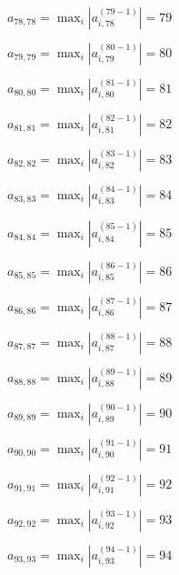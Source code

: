 \documentclass[a4paper,12pt]{article}
\begin{document}
$a _{ 78, 78 } =  \max _i |a _{ i, 78 } ^{ (79 - 1) } | = 79$

$a _{ 79, 79 } =  \max _i |a _{ i, 79 } ^{ (80 - 1) } | = 80$

$a _{ 80, 80 } =  \max _i |a _{ i, 80 } ^{ (81 - 1) } | = 81$

$a _{ 81, 81 } =  \max _i |a _{ i, 81 } ^{ (82 - 1) } | = 82$

$a _{ 82, 82 } =  \max _i |a _{ i, 82 } ^{ (83 - 1) } | = 83$

$a _{ 83, 83 } =  \max _i |a _{ i, 83 } ^{ (84 - 1) } | = 84$

$a _{ 84, 84 } =  \max _i |a _{ i, 84 } ^{ (85 - 1) } | = 85$

$a _{ 85, 85 } =  \max _i |a _{ i, 85 } ^{ (86 - 1) } | = 86$

$a _{ 86, 86 } =  \max _i |a _{ i, 86 } ^{ (87 - 1) } | = 87$

$a _{ 87, 87 } =  \max _i |a _{ i, 87 } ^{ (88 - 1) } | = 88$

$a _{ 88, 88 } =  \max _i |a _{ i, 88 } ^{ (89 - 1) } | = 89$

$a _{ 89, 89 } =  \max _i |a _{ i, 89 } ^{ (90 - 1) } | = 90$

$a _{ 90, 90 } =  \max _i |a _{ i, 90 } ^{ (91 - 1) } | = 91$

$a _{ 91, 91 } =  \max _i |a _{ i, 91 } ^{ (92 - 1) } | = 92$

$a _{ 92, 92 } =  \max _i |a _{ i, 92 } ^{ (93 - 1) } | = 93$

$a _{ 93, 93 } =  \max _i |a _{ i, 93 } ^{ (94 - 1) } | = 94$
\end{document}
